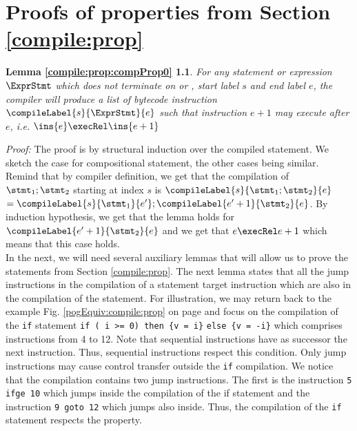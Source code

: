 \newtheorem{compPropApp}{Lemma}[chapter]

\newtheorem*{compProp0A}{Lemma  \ref{compile:prop:compProp0}}
\newtheorem*{compProp3A}{Lemma  \ref{compile:prop:compProp3}}
\newtheorem*{compProp8A}{Lemma  \ref{compile:prop:compProp8}}
\newtheorem*{compProp9A}{Lemma  \ref{compile:prop:compProp4}}

\chapter{Proofs of properties from Section \ref{compile:prop} }\label{appendix:compile:prop}


\begin{compProp0A}%
 For any statement or expression $\ExprStmt$ which does not terminate on \return{} or \athrow, start label $s$ and end label $e$,
    the compiler will produce a list of bytecode instruction $\compileLabel{s}{\ExprStmt}{e}$ such that  instruction  $e+1$ may execute after
    $e$, i.e.   $ \ins{e} \execRel \ins{e+1}$
\end{compProp0A}
\textit{Proof:} 
The proof  is by structural induction over the compiled statement.
We sketch the case for compositional statement, the other cases being similar. 
Remind that by compiler definition, we get that the compilation of $\stmt_1; \stmt_2$ starting at index $s$ is
 $\compileLabel{s}{\stmt_1; \stmt_2}{e}$ $ = \compileLabel{s}{\stmt_1}{e'};\compileLabel{e'+1}{\stmt_2}{e}$.
By  induction hypothesis, we get that the lemma holds for $\compileLabel{e'+1}{\stmt_2}{e}$ and we get that $e \execRel e+1$ 
which means that this case holds.
\Qed \\


In the next, we will need several auxiliary lemmas that will allow us to prove the statements from Section \ref{compile:prop}. 
The next lemma states that all the jump instructions in the compilation of a statement target instruction which are also 
in the compilation of the statement.
For illustration, we may return back to the example Fig. \ref{pogEquiv:compile:prop}  on page \pageref{pogEquiv:compile:prop} and focus on the 
compilation of the \lstinline!if!  statement   
\lstinline!if ( i >= 0) then {v = i}! \lstinline!else {v = -i}! 
which comprises instructions from 4 to 12. Note that sequential instructions   have as  successor the next instruction.  Thus, sequential
instructions respect this condition. 
Only jump instructions may cause control transfer outside the \lstinline!if! compilation. 
We notice that the compilation contains two jump instructions. 
The first is the instruction \lstinline!5 ifge 10! which jumps inside the compilation of the if statement
and the instruction \lstinline!9 goto 12!  which jumps also inside.
Thus, the compilation of the \lstinline!if! statement respects the property.


